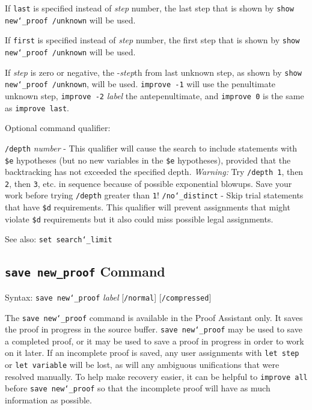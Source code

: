 If \texttt{last} is specified instead of {\em step} number, the last
step that is shown by \texttt{show new{\char`\_}proof /unknown} will be
used.

If \texttt{first} is specified instead of {\em step} number, the first
step that is shown by \texttt{show new{\char`\_}proof /unknown} will be
used.

If {\em step} is zero or negative, the -{\em step}th from last unknown
step, as shown by \texttt{show new{\char`\_}proof /unknown}, will be
used.  \texttt{improve -1} will use the penultimate
unknown step, \texttt{improve -2} {\em label} the antepenultimate, and
\texttt{improve 0} is the same as \texttt{improve last}.

Optional command qualifier:

    \texttt{/depth} {\em number} - This qualifier will cause the search
        to include
        statements with \texttt{\$e} hypotheses (but no new variables in
        the \texttt{\$e}
        hypotheses), provided that the backtracking has not exceeded the
        specified depth. {\em Warning:}  Try \texttt{/depth 1},
        then \texttt{2}, then \texttt{3}, etc.
        in sequence because of possible exponential blowups.  Save your
        work before trying \texttt{/depth} greater than \texttt{1}!
    \texttt{/no{\char`\_}distinct} - Skip trial statements that have
        \texttt{\$d} requirements.
        This qualifier will prevent assignments that might violate \texttt{\$d}
        requirements but it also could miss possible legal assignments.

See also: \texttt{set search{\char`\_}limit}

\subsection{\texttt{save new\_proof} Command}
Syntax:  \texttt{save new{\char`\_}proof} {\em label} [\texttt{/normal}]
   [\texttt{/compressed}]

The \texttt{save new{\char`\_}proof} command is available in the Proof
Assistant only.  It saves the proof in progress in the source
buffer.  \texttt{save new{\char`\_}proof} may be
used to save a completed proof, or it may be used to save a proof in
progress in order to work on it later.  If an incomplete proof is saved,
any user assignments with \texttt{let step} or \texttt{let variable}
will be lost, as will any ambiguous unifications that were resolved manually.
To help make recovery easier, it can be helpful to \texttt{improve all}
before \texttt{save new{\char`\_}proof} so that the incomplete proof
will have as much information as possible.

